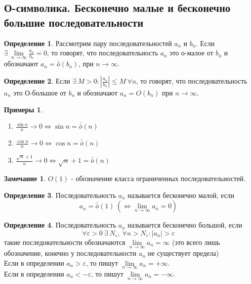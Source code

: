 \documentclass[a4paper, 12pt]{article}
\renewcommand{\epsilon}{\varepsilon}
\newcommand\tab[1][.5cm]{\hspace*{#1}}
\newcommand{\lims}{\lim\limits_{n\to \infty}}
\newcommand{\om}{\bar{\bar{o}}}
\theoremstyle{definition}
\newtheorem*{definition}{Определение}
\newtheorem*{comm}{Замечание}
\newtheorem*{examples}{Примеры}
\begin{document}
        \subsection{О-символика. Бесконечно малые и бесконечно большие последовательности}
        \begin{definition}
            Рассмотрим пару последовательностей $a_n$ и $b_n$. Если\\ $\exists\ \lims \frac{a_n}{b_n}=0$, то говорят, что последовательность $a_n$ это о-малое от $b_n$ и обозначают $a_n=\om(b_n)$, при $n\to \infty$. 
        \end{definition} 
        \begin{definition}
            Если $\exists\ M>0: |\frac{a_n}{b_n}|\leq M\ \forall n$, то говорят, что последовательность $a_n$ это О-большое от $b_n$ и обозначают $a_n=O(b_n)$ при $n\to \infty$.
        \end{definition} 
        \begin{examples}\tab
            \begin{enumerate}
                \item $\frac{\sin n}{n}\to 0 \Leftrightarrow \sin n = \om(n)$
                \item $\frac{\cos n}{n}\to 0 \Leftrightarrow \cos n = \om(n)$
                \item $\frac{\sqrt{n}+1}{n}\to 0 \Leftrightarrow \sqrt{n}+1 = \om(n)$
            \end{enumerate}
        \end{examples}
        \begin{comm}
            $O(1)$ - обозначение класса ограниченных последовательностей.
        \end{comm} 
        \begin{definition}
            Последовательность $a_n$ называется бесконечно малой, если 
            \[a_n=\om(1)\ (\Leftrightarrow \lim\limits_{n\to \infty}a_n=0)\]
        \end{definition} 
        \begin{definition}
            Последовательность $a_n$ называется бесконечно большой, если 
            \[\forall \epsilon>0\ \exists\ N_{\epsilon},\ \forall n>N_{\epsilon}: |a_n|>\epsilon\] 
            такие последовательности обозначаются $\lims a_n=\infty$ (это всего лишь обозначение, конечно у последовательности $a_n$ не существует предела)\\
            Если в определении $a_n>\epsilon$, то пишут $\lims a_n=+\infty$.\\
            Если в определении $a_n<-\epsilon$, то пишут $\lims a_n=-\infty$.
        \end{definition} 
\end{document}
